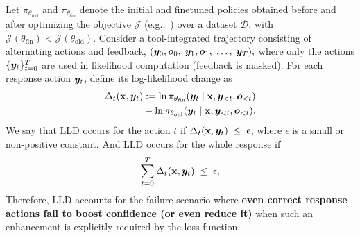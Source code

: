 

\begin{definition}\label{def:lld}
Let $\pi_{\theta_{\mathrm{old}}}$ and $\pi_{\theta_{\mathrm{fin}}}$ denote the initial and finetuned policies obtained before and after optimizing the objective $\mathcal{J}$ (e.g.,~) over a dataset $\mathcal{D}$, with $\mathcal{J}(\theta_{\mathrm{fin}}) < \mathcal{J}(\theta_{\mathrm{old}})$.
Consider a tool-integrated trajectory consisting of alternating actions and feedback,
$(\bm{y}_{0}, \bm{o}_{0},\; \bm{y}_{1}, \bm{o}_{1},\;\ldots,\;\bm{y}_{T}),$
where only the actions $\{\bm{y}_t\}_{t=0}^{T}$ are used in likelihood computation (feedback is masked).  
For each response action $\bm{y}_t$, define its log-likelihood change as
\begin{align}
\Delta_t(\mathbf{x},\bm{y}_t)
&:=
\ln \pi_{\theta_{\mathrm{fin}}}(\bm{y}_t \mid \mathbf{x},\bm{y}_{<t},\bm{o}_{<t}) 
\nonumber \\ &-
\ln \pi_{\theta_{\mathrm{old}}}(\bm{y}_t \mid \mathbf{x},\bm{y}_{<t},\bm{o}_{<t}). \nonumber
\end{align}
We say that LLD occurs for the action $t$ if  
$\Delta_t(\mathbf{x},\bm{y}_t) \;\le\; \epsilon$,
where $\epsilon$ is a small or non-positive constant. And LLD occurs for the whole response if 
\begin{equation}
\sum_{t=0}^T \Delta_t(\mathbf{x},\bm{y}_t) \;\le\; \epsilon,
\end{equation}
Therefore, LLD accounts for the failure scenario where \textbf{even correct response actions fail to boost confidence (or even reduce it)} when such an enhancement is explicitly required by the loss function.
\end{definition}
